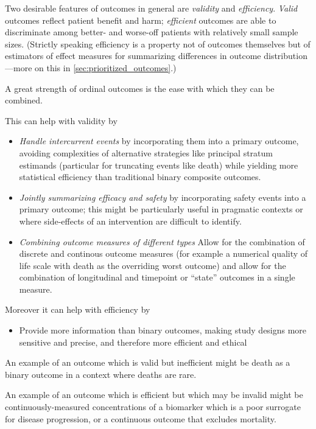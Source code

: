 \documentclass[
  11pt,
  fleqn
]{article}
\begin{document}
Two desirable features of outcomes in general are \emph{validity} and
\emph{efficiency}. \emph{Valid} outcomes reflect patient benefit and harm;
\emph{efficient} outcomes are able to discriminate among better- and worse-off
patients with relatively small sample sizes. (Strictly speaking efficiency is a
  property not of outcomes themselves but of estimators of effect measures for
  summarizing differences in outcome distribution---more on this in
\ref{sec:prioritized_outcomes}.)

A great strength of ordinal outcomes is the ease with which they can
be combined.

This can help with validity by

\begin{itemize}
  \item \emph{Handle intercurrent events} by incorporating them into a primary
    outcome, avoiding complexities of alternative strategies like
    principal stratum
    estimands (particular for truncating events like death) while
    yielding more
    statistical efficiency than traditional binary composite outcomes.

  \item \emph{Jointly summarizing efficacy and safety} by incorporating
    safety events into a
    primary outcome; this might be particularly useful in pragmatic
    contexts or where side-effects of an intervention are difficult to identify.

  \item \emph{Combining outcome measures of different types} Allow
    for the combination of discrete and continous outcome
    measures (for
      example a numerical quality of life scale with death as the
      overriding worst
    outcome) and allow for the combination of longitudinal and timepoint or
    ``state'' outcomes in a single measure.
\end{itemize}

Moreover it can help with efficiency by

\begin{itemize}
  \item Provide more information than binary outcomes, making study
    designs more sensitive and precise, and
    therefore more efficient and ethical
\end{itemize}

An example of an outcome which is valid but inefficient might be
death as a binary outcome in a context where deaths
are rare.

An example of an outcome which is efficient but which may be invalid
might be continuously-measured concentrations of a biomarker which is a poor
surrogate for disease progression, or a continuous outcome that
excludes mortality.
\end{document}
